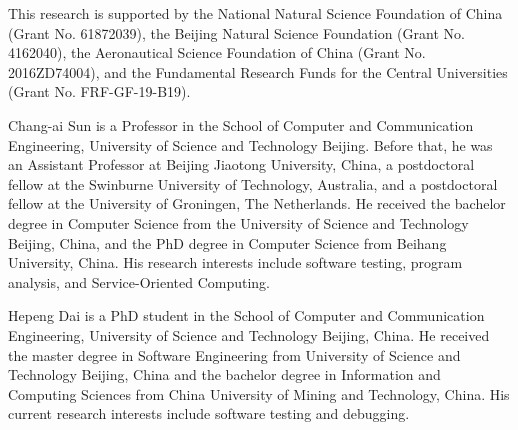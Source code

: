 \documentclass[10pt,journal,compsoc]{IEEEtran}
\begin{document}
This research is supported by
the National Natural Science Foundation of China (Grant No. 61872039),
the Beijing Natural Science Foundation (Grant No. 4162040),
the Aeronautical Science Foundation of China (Grant No. 2016ZD74004), and
the Fundamental Research Funds for the Central Universities (Grant No. FRF-GF-19-B19).
\ifCLASSOPTIONcaptionsoff
  \newpage
\fi


\begin{IEEEbiography}{Chang-ai Sun} is a Professor in the School of Computer and Communication Engineering, University of Science and Technology Beijing.
Before that, he was an Assistant Professor at Beijing Jiaotong University, China, a postdoctoral fellow at the Swinburne University of Technology, Australia, and a postdoctoral fellow at the University of Groningen, The Netherlands. He received the bachelor degree in Computer Science from the University of Science and Technology Beijing, China, and the PhD degree in Computer Science from Beihang University, China.
His research interests include software testing, program analysis, and Service-Oriented Computing.
\end{IEEEbiography}
\begin{IEEEbiography}{Hepeng Dai} is a PhD student in the School of Computer and Communication Engineering, University of Science and Technology Beijing, China. He received the master degree in Software Engineering from University of Science and Technology Beijing, China and the bachelor degree in Information and Computing Sciences from China University of Mining and Technology, China. His current research interests include software testing and debugging.
\end{IEEEbiography}
\end{document}
